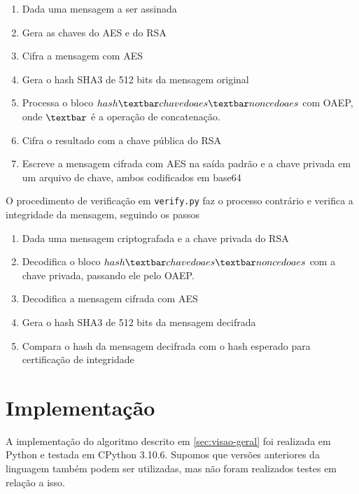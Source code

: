 \documentclass[a4paper, 10.5pt]{article}
\begin{document}
    \begin{enumerate}
        \item Dada uma mensagem a ser assinada
        \item Gera as chaves do AES e do RSA
        \item Cifra a mensagem com AES
        \item Gera o hash SHA3 de 512 bits da mensagem original
        \item Processa o bloco $hash \textbar chave do aes \textbar nonce do aes$
            com OAEP, onde $\textbar$ é a operação de concatenação.
        \item Cifra o resultado com a chave pública do RSA
        \item Escreve a mensagem cifrada com AES na saída padrão e a chave
            privada em um arquivo de chave, ambos codificados em base64
    \end{enumerate}

    O procedimento de verificação em \verb|verify.py| faz o processo contrário e
    verifica a integridade da mensagem, seguindo os passos

    \begin{enumerate}
        \item Dada uma mensagem criptografada e a chave privada do RSA
        \item Decodifica o bloco $hash \textbar chave do aes \textbar nonce do aes$
            com a chave privada, passando ele pelo OAEP.
        \item Decodifica a mensagem cifrada com AES
        \item Gera o hash SHA3 de 512 bits da mensagem decifrada
        \item Compara o hash da mensagem decifrada com o hash esperado para
            certificação de integridade
    \end{enumerate}

\section{Implementação} %
\label{sec:implementacao}
    A implementação do algoritmo descrito em \ref{sec:visao-geral} foi realizada
    em Python e testada em CPython 3.10.6. Supomos que versões anteriores da linguagem
    também podem ser utilizadas, mas não foram realizados testes em relação a
    isso.
\end{document}
